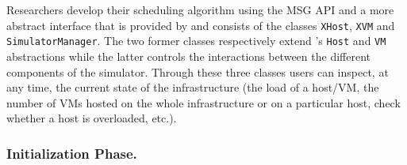 Researchers develop their scheduling algorithm using the \sg
MSG API and a more abstract interface that is provided by \vmps
and consists of the classes \texttt{XHost}, \texttt{XVM} and
\texttt{SimulatorManager}. The two former classes respectively
extend \sg's \texttt{Host} and \texttt{VM} abstractions while the
latter controls the interactions between the different components of
the simulator.  Through these three classes users can
inspect, at any time, the current state of the infrastructure (\ie the
load of a host/VM, the number of VMs hosted on the whole
infrastructure or on a particular host, check whether a host is
overloaded, etc.).




\subsubsection{Initialization Phase.}

